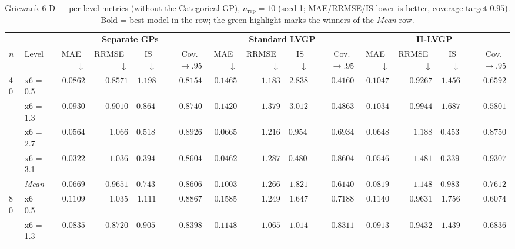 \begin{table}[htbp]
\centering
\scriptsize
\setlength{\tabcolsep}{2.5pt}
\setlength{\fboxsep}{1pt}
\caption{Griewank 6-D --- per-level metrics (without the Categorical GP), $n_{\mathrm{rep}}=10$ (seed 1; MAE/RRMSE/IS lower is better, coverage target $0.95$). Bold = best model in the row; the green highlight marks the winners of the \emph{Mean} row.}
\label{tab:griewank_6d_nrep10_nocat}
\begin{tabular}{llrrrrrrrrrrrr}
\toprule
 & & \multicolumn{4}{c}{\textbf{Separate GPs}} & \multicolumn{4}{c}{\textbf{Standard LVGP}} & \multicolumn{4}{c}{\textbf{H-LVGP}} \\
\cmidrule(lr){3-6} \cmidrule(lr){7-10} \cmidrule(lr){11-14}
$n$ & Level & MAE~$\downarrow$ & RRMSE~$\downarrow$ & IS~$\downarrow$ & Cov.~$\to.95$ & MAE~$\downarrow$ & RRMSE~$\downarrow$ & IS~$\downarrow$ & Cov.~$\to.95$ & MAE~$\downarrow$ & RRMSE~$\downarrow$ & IS~$\downarrow$ & Cov.~$\to.95$ \\
\midrule
\multirow{5}{*}{40} & x6 = 0.5 & {\boldmath$0.0862$} & {\boldmath$0.8571$} & {\boldmath$1.198$} & {\boldmath$0.8154$} & $0.1465$ & $1.183$ & $2.838$ & $0.4160$ & $0.1047$ & $0.9267$ & $1.456$ & $0.6592$ \\
 & x6 = 1.3 & {\boldmath$0.0930$} & {\boldmath$0.9010$} & {\boldmath$0.8643$} & {\boldmath$0.8740$} & $0.1420$ & $1.379$ & $3.012$ & $0.4863$ & $0.1034$ & $0.9944$ & $1.687$ & $0.5801$ \\
 & x6 = 2.7 & {\boldmath$0.0564$} & {\boldmath$1.066$} & $0.5188$ & {\boldmath$0.8926$} & $0.0665$ & $1.216$ & $0.9542$ & $0.6934$ & $0.0648$ & $1.188$ & {\boldmath$0.4539$} & $0.8750$ \\
 & x6 = 3.1 & {\boldmath$0.0322$} & {\boldmath$1.036$} & $0.3945$ & $0.8604$ & $0.0462$ & $1.287$ & $0.4803$ & $0.8604$ & $0.0546$ & $1.481$ & {\boldmath$0.3397$} & {\boldmath$0.9307$} \\
 & \textit{Mean} & \colorbox{green!20}{\boldmath$0.0669$} & \colorbox{green!20}{\boldmath$0.9651$} & \colorbox{green!20}{\boldmath$0.7438$} & \colorbox{green!20}{\boldmath$0.8606$} & $0.1003$ & $1.266$ & $1.821$ & $0.6140$ & $0.0819$ & $1.148$ & $0.9839$ & $0.7612$ \\
\midrule
\multirow{5}{*}{80} & x6 = 0.5 & {\boldmath$0.1109$} & $1.035$ & {\boldmath$1.111$} & {\boldmath$0.8867$} & $0.1585$ & $1.249$ & $1.647$ & $0.7188$ & $0.1140$ & {\boldmath$0.9631$} & $1.756$ & $0.6074$ \\
 & x6 = 1.3 & {\boldmath$0.0835$} & {\boldmath$0.8720$} & {\boldmath$0.9051$} & {\boldmath$0.8398$} & $0.1148$ & $1.065$ & $1.014$ & $0.8311$ & $0.0913$ & $0.9432$ & $1.439$ & $0.6836$ \\

\end{tabular}
\end{table}
